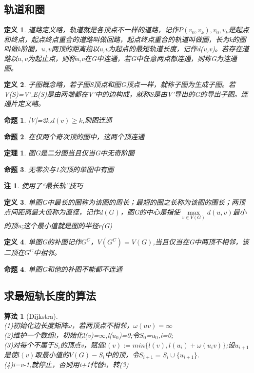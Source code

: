 \documentclass[UTF8]{ctexart}
\newtheorem{dfnt}{定义}
\newtheorem{thr}{定理}
\newtheorem*{note}{注}
\newtheorem{pro}{命题}
\newtheorem{alg}{算法}
\begin{document}
\subsection{轨道和圈}
\begin{dfnt}
道路定义略，轨道就是各顶点不一样的道路，记作$P(v_0,v_k),v_0,v_k$是起点和终点，起点终点重合的道路叫做回路，起点终点重合的轨道叫做圈，长为k的圈叫做k阶圈，$u,v$两顶的距离指以u,v为起点的最短轨道长度，记作d(u,v)。若存在道路以$u,v$为起止点，则称u,v在G中连通，若G中任意两点都连通，则称G为连通图。
\end{dfnt}
\begin{dfnt}
子图概念略，若子图S顶点和图G顶点一样，就称子图为生成子图。若V(S)=V',E(S)是由两端都在V'中的边构成，就称S是由V'导出的G的导出子图。连通片定义略。
\end{dfnt}
\begin{pro}
|V|=2k,$d(v) \geq k$,则图连通
\end{pro}
\begin{pro}
在仅两个奇次顶的图中，这两个顶连通
\end{pro}
\begin{thr}
图G是二分图当且仅当G中无奇阶圈
\end{thr}
\begin{pro}
无零次与1次顶的单图中有圈
\end{pro}
\begin{note}
使用了“最长轨”技巧
\end{note}
\begin{dfnt}
单图G中最长的圈称为该图的周长；最短的圈之长称为该图的围长；两顶点间距离最大值称为直径，记作$d(G)$，图G的中心是指使$\max \limits_{v \in V(G)} d(u,v)$最小的顶u;这个最小值就是图的半径r(G)
\end{dfnt}
\begin{dfnt}
单图G的补图记作$G^C$，$V(G^C)=V(G)$,当且仅当在G中两顶不相邻，该二顶在$G^C$中相邻。
\end{dfnt}
\begin{pro}
单图G和他的补图不能都不连通
\end{pro}
\subsection{求最短轨长度的算法}
\begin{alg}[Dijkstra]
\quad \\(1)初始化边长度矩阵$\omega$，若两顶点不相邻，$\omega (uv) =\infty$\\(2)维护一个数组l，初始化l(v)=$\infty$,l($u_0$)=0;令$S_0$={$u_0$},i=0;\\(3)对每个不属于$S_i$的顶点v，赋值$l(v):=min\{l(v),l(u_i)+\omega (u_iv)\}$;设$u_{i+1}$是使$l(v)$取最小值的$V(G)-S_i$中的顶，令$S_{i+1} = S_i \cup \{u_{i+1}\}.$\\(4)i=v-1,就停止，否则用i+1代替i，转(3)
\end{alg}
\end{document}
